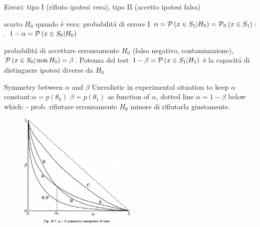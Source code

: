\documentclass[asd-beamer.tex]{subfiles}
\begin{document}
\begin{frame}{Errori: tipo I (rifiuto ipotesi vera), tipo II (accetto ipotesi falsa)}
\begin{block}{ }
	scarto $H_0$ quando \'e vera: probabilit\'a di errore I $\alpha=\operatorname{\mathcal{P}}{(x\in S_1|H_0)}=\operatorname{\mathcal{P}}_0{(x\in S_1)}$: .  $1-\alpha=\operatorname{\mathcal{P}}{(x\in S_0|H_0)}$
\end{block}
\begin{block}{}
	probabilit\'a di accettare erroneamente $H_0$ (falso negativo, contaminazione), $\operatorname{\mathcal{P}}{(x\in S_0|\operatorname{non}{H_0})}=\beta$. Potenza del test $1-\beta=\operatorname{\mathcal{P}}{(x\in S_1|H_1)}$ \'e la capacit\'a di distinguere ipotesi diverse da $H_0$ 
\end{block}
\end{frame}

\begin{frame}{Symmetry between $\alpha$ and $\beta$}
Unrealistic in experimental situation to keep $\alpha$ constant:$\alpha=p(\theta_0)$ $\beta=p(\theta_1)$ as function of $\alpha$, dotted line $\alpha=1-\beta$ below which:  - prob. rifiutare erroneamente $H_0$ minore di rifiutarla giustamente.
\begin{figure}[!ht]\includegraphics[trim={0cm 0cm 0 0},clip, keepaspectratio,width=0.5\textwidth]{figures/james/test/testabsym}\label{fig:testabsym}\end{figure}
\end{frame}
\end{document}
